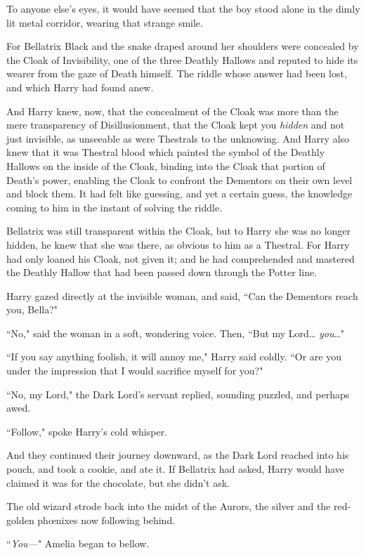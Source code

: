 To anyone else's eyes, it would have seemed that the boy stood alone in the dimly lit metal corridor, wearing that strange smile.

For Bellatrix Black and the snake draped around her shoulders were concealed by the Cloak of Invisibility, one of the three Deathly Hallows and reputed to hide its wearer from the gaze of Death himself. The riddle whose answer had been lost, and which Harry had found anew.

And Harry knew, now, that the concealment of the Cloak was more than the mere transparency of Disillusionment, that the Cloak kept you \emph{hidden} and not just invisible, as unseeable as were Thestrals to the unknowing. And Harry also knew that it was Thestral blood which painted the symbol of the Deathly Hallows on the inside of the Cloak, binding into the Cloak that portion of Death's power, enabling the Cloak to confront the Dementors on their own level and block them. It had felt like guessing, and yet a certain guess, the knowledge coming to him in the instant of solving the riddle.

Bellatrix was still transparent within the Cloak, but to Harry she was no longer hidden, he knew that she was there, as obvious to him as a Thestral. For Harry had only loaned his Cloak, not given it; and he had comprehended and mastered the Deathly Hallow that had been passed down through the Potter line.

Harry gazed directly at the invisible woman, and said, ``Can the Dementors reach you, Bella?"

``No," said the woman in a soft, wondering voice. Then, ``But my Lord{\ldots} \emph{you}{\ldots}"

``If you say anything foolish, it will annoy me," Harry said coldly. ``Or are you under the impression that I would sacrifice myself for you?"

``No, my Lord," the Dark Lord's servant replied, sounding puzzled, and perhaps awed.

``Follow," spoke Harry's cold whisper.

And they continued their journey downward, as the Dark Lord reached into his pouch, and took a cookie, and ate it. If Bellatrix had asked, Harry would have claimed it was for the chocolate, but she didn't ask.

\later

The old wizard strode back into the midst of the Aurors, the silver and the red-golden phœnixes now following behind.

``\emph{You—}" Amelia began to bellow.

